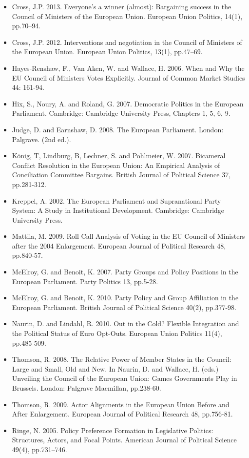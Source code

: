 \begin{itemize}
	\item Cross, J.P. 2013. Everyone’s a winner (almost): Bargaining success in the Council of Ministers of the European Union. European Union Politics, 14(1), pp.70–94.
	\item Cross, J.P. 2012. Interventions and negotiation in the Council of Ministers of the European Union. European Union Politics, 13(1), pp.47–69.
	\item Hayes-Renshaw, F., Van Aken, W. and Wallace, H. 2006. When and Why the EU Council of Ministers Votes Explicitly. Journal of Common Market Studies 44: 161-94.
	\item Hix, S., Noury, A. and Roland, G. 2007. Democratic Politics in the European Parliament. Cambridge: Cambridge University Press, Chapters 1, 5, 6, 9. 
	\item Judge, D. and Earnshaw, D. 2008. The European Parliament. London: Palgrave. (2nd ed.).
	\item K{\"o}nig, T, Lindburg, B, Lechner, S. and Pohlmeier, W. 2007. Bicameral Conflict Resolution in the European Union: An Empirical Analysis of Conciliation Committee Bargains. British Journal of Political Science 37, pp.281-312.
	\item Kreppel, A. 2002. The European Parliament and Supranational Party System: A Study in Institutional Development. Cambridge: Cambridge University Press. 
	\item Mattila, M. 2009. Roll Call Analysis of Voting in the EU Council of Ministers after the 2004 Enlargement. European Journal of Political Research 48, pp.840-57.
	\item McElroy, G. and Benoit, K. 2007. Party Groups and Policy Positions in the European Parliament. Party Politics 13, pp.5-28.
	\item McElroy, G. and Benoit, K. 2010. Party Policy and Group Affiliation in the European Parliament. British Journal of Political Science 40(2), pp.377-98.
	\item Naurin, D. and Lindahl, R. 2010. Out in the Cold? Flexible Integration and the Political Status of Euro Opt-Outs. European Union Politics 11(4), pp.485-509.
	\item Thomson, R. 2008. The Relative Power of Member States in the Council: Large and Small, Old and New. In Naurin, D. and Wallace, H. (eds.) Unveiling the Council of the European Union: Games Governments Play in Brussels. London: Palgrave Macmillan, pp.238-60.
	\item Thomson, R. 2009. Actor Alignments in the European Union Before and After Enlargement. European Journal of Political Research 48, pp.756-81.
	\item Ringe, N. 2005. Policy Preference Formation in Legislative Politics: Structures, Actors, and Focal Points. American Journal of Political Science 49(4), pp.731–746.
\end{itemize}